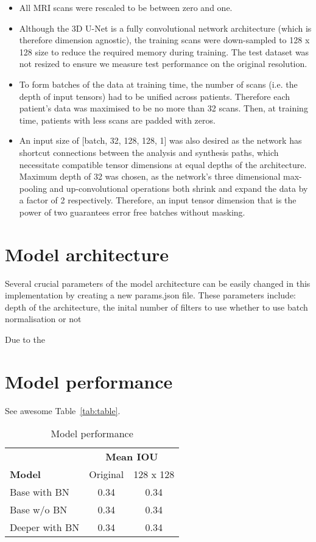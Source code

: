 \documentclass{article}
\begin{document}
\begin{itemize}
	\item All MRI scans were rescaled to be between zero and one.
	\item Although the 3D U-Net is a fully convolutional network architecture (which is therefore dimension agnostic), the training scans were down-sampled to 128 x 128 size to reduce the required memory during training. The test dataset was not resized to ensure we measure test performance on the original resolution.
	\item To form batches of the data at training time, the number of scans (i.e. the depth of input tensors) had to be unified across patients. Therefore each patient's data was maximised to be no more than 32 scans. Then, at training time, patients with less scans are padded with zeros.
	\item An input size of [batch, 32, 128, 128, 1] was also desired as the network has shortcut connections between the analysis and synthesis paths, which necessitate compatible tensor dimensions at equal depths of the architecture. Maximum depth of 32 was chosen, as the network's three dimensional max-pooling and up-convolutional operations both shrink and expand the data by a factor of 2 respectively. Therefore, an input tensor dimension that is the power of two guarantees error free batches without masking.	
\end{itemize}


\section{Model architecture}

Several crucial parameters of the model architecture can be easily changed in this implementation by creating a new params.json file. These parameters include:
depth of the architecture,
the inital number of filters to use
whether to use batch normalisation or not

Due to the

\section{Model performance}

See awesome Table~\ref{tab:table}.

\begin{table}[t]
	\centering
	\begin{tabular}{lcc}
		\toprule
		{} & \multicolumn{2}{c}{\textbf{Mean IOU}}  \\
		\cmidrule(r){2-3}
		\textbf{Model}     & Original     & 128 x 128 \\
		\midrule
		Base with BN    & 0.34  & 0.34  \\
		Base w/o BN     & 0.34  & 0.34  \\
		Deeper with BN  & 0.34  & 0.34  \\
		\bottomrule
	\end{tabular}
	\vspace{3mm}
	\caption{Model performance}
\end{table}
\end{document}
